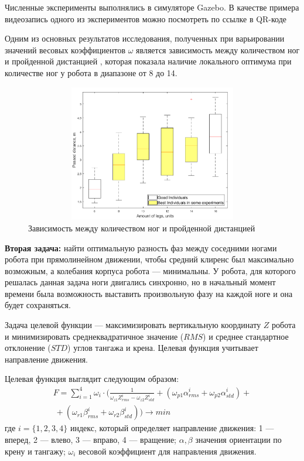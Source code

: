 Численные эксперименты выполнялись в симуляторе Gazebo. В качестве примера видеозапись одного из экспериментов можно посмотреть по ссылке в QR-коде \quad {}

Одним из основных результатов исследования, полученных при варьировании значений весовых коэффициентов $\omega$ является зависимость между количеством ног и пройденной дистанцией , которая показала наличие локального оптимума при количестве ног у робота в диапазоне от 8 до 14. 

\begin{figure}[H]
    \centering\includegraphics[height=6cm,width=1\textwidth,keepaspectratio]{images/box_plot_structural_synthesis.png}
    \caption{Зависимость между количеством ног и пройденной дистанцией}
    \label{fig:box_plot_structural_synthesis.png}
\end{figure}

\textbf{Вторая задача:} найти оптимальную разность фаз между соседними ногами робота при прямолинейном движении, чтобы средний клиренс был максимально возможным, а колебания корпуса робота --- минимальны. У робота, для которого решалась данная задача ноги двигались синхронно, но в начальный момент времени была возможность выставить произвольную фазу на каждой ноге и она будет сохраняться.

Задача целевой функции --- максимизировать вертикальную координату $Z$ робота и минимизировать среднеквадратичное значение ($RMS$) и среднее стандартное отклонение ($STD$) углов тангажа и крена. Целевая функция учитывает направление движения.

Целевая функция выглядит следующим образом:
\begin{align}
    \label{eq:objective}
    F = \sum\limits_{i=1}^4 \omega_{i} \cdot (\frac{1}{\omega_{z1}Z_{rms}^i - \omega_{z2}Z_{std}^i}  + ( \omega_{p1}\alpha_{rms}^i + \omega_{p2}\alpha_{std}^i) + \nonumber \\\ + (\omega_{r1}\beta_{rms}^i + \omega_{r2}\beta_{std}^i)) \rightarrow min
\end{align}
где $i =\{1,2,3,4\}$ индекс, который определяет направление движения: 1 --- вперед, 2 --- влево, 3 --- вправо, 4 --- вращение; $\alpha, \beta$ значения ориентации по крену и тангажу; $\omega_{i}$ весовой коэффициент для направления движения.

